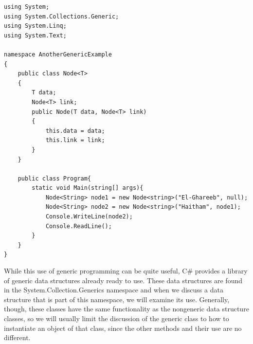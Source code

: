 \documentclass[12pt,a4paper,final,twoside,titlepage]{book}
\begin{document}
\begin{lstlisting}
using System;
using System.Collections.Generic;
using System.Linq;
using System.Text;

namespace AnotherGenericExample
{
    public class Node<T>
    {
        T data;
        Node<T> link;
        public Node(T data, Node<T> link)
        {
            this.data = data;
            this.link = link;
        }
    }

    public class Program{
        static void Main(string[] args){
            Node<String> node1 = new Node<string>("El-Ghareeb", null);
            Node<String> node2 = new Node<string>("Haitham", node1);
            Console.WriteLine(node2);
            Console.ReadLine();
        }
    }
}
\end{lstlisting}
While this use of generic programming can be quite useful, C\# provides a library of generic data structures already ready to use. These data structures are found in the System.Collection.Generics namespace and when we discuss a data structure that is part of this namespace, we will examine its use. Generally, though, these classes have the same functionality as the nongeneric data structure classes, so we will usually limit the discussion of the generic class to how to instantiate an object of that class, since the other methods and their use are no different.
\end{document}
